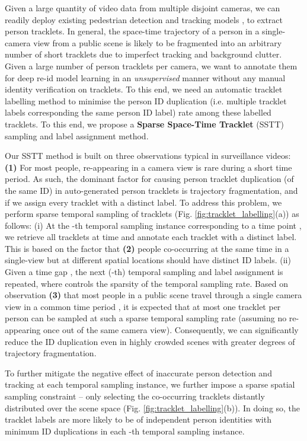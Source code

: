 \documentclass[runningheads]{llncs}
\begin{document}
Given a large quantity of video data from multiple disjoint cameras,
we can readily deploy existing
pedestrian detection and tracking models
\cite{zheng2017unlabeled,ristani2016performance,leal2015motchallenge,zhang2016far}, 
to extract person tracklets. 
In general, the space-time trajectory of a person in a single-camera
view from a public scene is likely to be fragmented into an arbitrary number of short tracklets
due to imperfect tracking and background clutter.
Given a large number of person tracklets per camera, we want to annotate them for deep re-id model learning
in an {\em unsupervised} manner
without any manual identity verification on tracklets.
To this end, we need an automatic tracklet labelling method
to minimise the person ID duplication (i.e. multiple tracklet labels corresponding the
same person ID label) rate among these labelled tracklets.
To this end, 
we propose a {\bf Sparse Space-Time Tracklet} (SSTT) sampling and
label assignment method.

Our SSTT method is built on three observations 
typical in surveillance videos:
{\bf(1)} For most people, 
re-appearing in a camera view is rare during a short time period.
As such, the dominant factor for causing person tracklet duplication
(of the same ID) in
auto-generated person tracklets is trajectory fragmentation, and if we assign every tracklet with a distinct label.
To address this problem, we perform sparse temporal sampling of tracklets
(Fig. \ref{fig:tracklet_labelling}(a)) as follows:
(i) At the -th temporal sampling instance corresponding to a time point ,
we retrieve all tracklets at time 
and annotate each tracklet with a distinct label. 
This is based on the factor that
{\bf(2)} people co-occurring at the same time in a single-view but 
at different spatial locations should have distinct ID labels.
(ii) Given a time gap , the next (-th) temporal sampling and
label assignment is repeated, where  controls the sparsity of the temporal sampling rate.
Based on observation {\bf(3)} that
most people in a public scene travel through a single camera view
in a common time period , 
it is expected that at most one tracklet per person can
be sampled at such a sparse temporal sampling rate (assuming no
re-appearing once out of the same camera view).
Consequently, we can significantly reduce the
ID duplication even in highly crowded scenes with greater degrees of trajectory fragmentation.


To further mitigate the negative effect of inaccurate person detection
and tracking at each temporal sampling instance, we 
further impose a sparse spatial sampling constraint
-- only selecting the co-occurring
tracklets distantly distributed over the scene space (Fig. \ref{fig:tracklet_labelling}(b)).
In doing so, 
the tracklet labels are more likely to be of independent person identities
with minimum ID duplications in each -th temporal sampling instance. 
\end{document}
